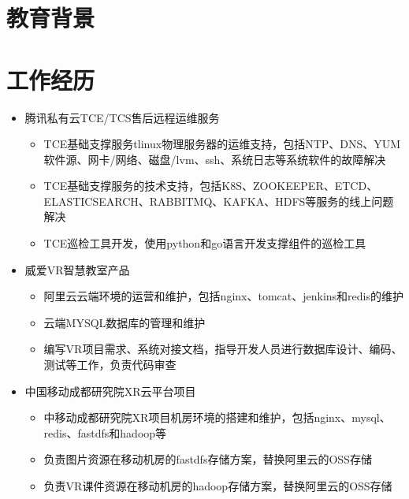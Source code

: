 \documentclass{resume}
\begin{document}
\section{教育背景}

\vspace{4mm}

\section{工作经历}
\begin{itemize}
  \item 腾讯私有云TCE/TCS售后远程运维服务
  \begin{itemize}
    \item TCE基础支撑服务tlinux物理服务器的运维支持，包括NTP、DNS、YUM软件源、网卡/网络、磁盘/lvm、ssh、系统日志等系统软件的故障解决
    \item TCE基础支撑服务的技术支持，包括K8S、ZOOKEEPER、ETCD、ELASTICSEARCH、RABBITMQ、KAFKA、HDFS等服务的线上问题解决
    \item TCE巡检工具开发，使用python和go语言开发支撑组件的巡检工具
  \end{itemize}
\end{itemize}

\begin{itemize}
  \item 威爱VR智慧教室产品
  \begin{itemize}
    \item 阿里云云端环境的运营和维护，包括nginx、tomcat、jenkins和redis的维护
    \item 云端MYSQL数据库的管理和维护
    \item 编写VR项目需求、系统对接文档，指导开发人员进行数据库设计、编码、测试等工作，负责代码审查
  \end{itemize}
  \item 中国移动成都研究院XR云平台项目
  \begin{itemize}
    \item 中移动成都研究院XR项目机房环境的搭建和维护，包括nginx、mysql、redis、fastdfs和hadoop等
    \item 负责图片资源在移动机房的fastdfs存储方案，替换阿里云的OSS存储
    \item 负责VR课件资源在移动机房的hadoop存储方案，替换阿里云的OSS存储
  \end{itemize}
\end{itemize}
\end{document}
